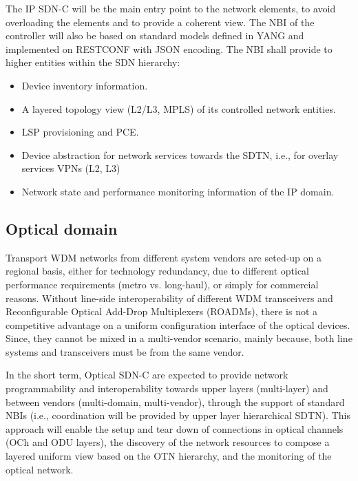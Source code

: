 \documentclass[a4paper,fleqn]{cas-dc}
\begin{document}
The IP SDN-C will be the main entry point to the network elements, to avoid overloading the elements and to provide a coherent view. The NBI of the controller will also be based on standard models defined in YANG and implemented on RESTCONF with JSON encoding. The NBI shall provide to higher entities within the SDN hierarchy:
\begin{itemize}
\item Device inventory information.
\item A layered topology view (L2/L3, MPLS) of its controlled network entities.
\item LSP provisioning and PCE.
\item Device abstraction for network services towards the SDTN, i.e., for overlay services VPNs (L2, L3)
\item Network state and performance monitoring information of the IP domain. 
\end{itemize}

\subsection{Optical domain}
\label{section:dwdm}
Transport WDM networks from different system vendors are seted-up on a regional basis, either for technology redundancy, due to different optical performance requirements (metro vs. long-haul), or simply for commercial reasons. 
Without line-side interoperability of different WDM transceivers and Reconfigurable Optical Add-Drop Multiplexers (ROADMs), there is not a competitive advantage on a uniform configuration interface of the optical devices. Since, they cannot be mixed in a multi-vendor scenario, mainly because, both line systems and transceivers must be from the same vendor.

In the short term, Optical SDN-C are expected to provide network programmability and interoperability towards upper layers (multi-layer) and between vendors (multi-domain, multi-vendor), through the support of standard NBIs (i.e., coordination will be provided by upper layer hierarchical SDTN). This approach will enable the setup and tear down of connections in optical channels (OCh and ODU layers), the discovery of the network resources to compose a layered uniform view based on the OTN hierarchy, and the monitoring of the optical network.
\end{document}
